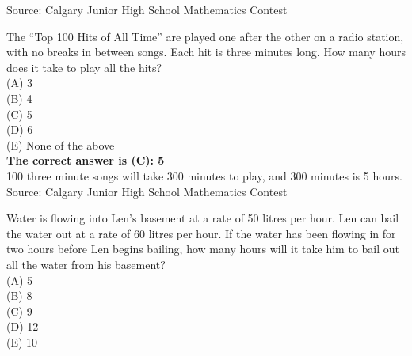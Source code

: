\documentclass{article}
\begin{document}
\parindent=0cm
\parskip=6pt
\pagestyle{empty}


\scriptsize
Source: Calgary Junior High School Mathematics Contest

\normalsize
The ``Top 100 Hits of All Time'' are played one after the other on a radio station, with no breaks in between songs. Each hit is three minutes long. How many hours does it take to play all the hits?\\
(A) 3\\
(B) 4\\
(C) 5\\
(D) 6\\
(E) None of the above\\


\textbf{The correct answer is (C): 5}\\[1 ex]
100 three minute songs will take 300 minutes to play, and 300 minutes is 5 hours.
\\[5 ex]

\scriptsize
Source: Calgary Junior High School Mathematics Contest

\normalsize
Water is flowing into Len's basement at a rate of 50 litres per hour. Len can bail the water out at a rate of 60 litres per hour. If the water has been flowing in for two hours before Len begins bailing, how many hours will it take him to bail out all the water from his basement?\\
(A) 5\\
(B) 8\\
(C) 9\\
(D) 12\\
(E) 10\\
\end{document}
